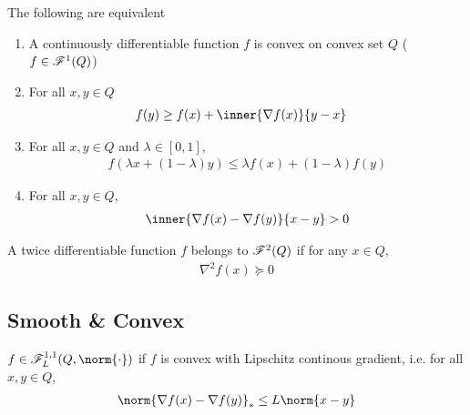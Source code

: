 \documentclass[../summary.tex]{subfiles}
\begin{document}
\begin{definition}
    The following are equivalent
    \begin{enumerate}
        \item A continuously differentiable function $f$ is convex on convex set $Q$ ($f\in\mathscr{F}^1(Q)$) 
        \item For all $x,y\in Q$
        \begin{align}
            f(y)
                &\geq f(x) + \inner{\nabla f(x)}{y-x}
                \label{eq:definition_convex}
        \end{align}
        \item For all $x,y\in Q$ and $\lambda \in[0,1]$,
        \begin{align}
            f(\lambda x + (1-\lambda)y) 
                \leq \lambda f(x) + (1-\lambda )f(y)
        \end{align}
        \item For all $x,y\in Q$, 
        \begin{align}
            \inner{\nabla f(x) - \nabla f(y)}{x - y} > 0
        \end{align}
    \end{enumerate}
\end{definition}

\begin{definition}
    A twice differentiable function $f$ belongs to $\mathscr{F}^2(Q)$ if for any $x\in Q$, 
    \begin{align}
        \nabla^2 f(x) \succeq 0
    \end{align}
\end{definition}

\subsection{Smooth \& Convex}

\begin{definition}
    $f\in \scrF^{1,1}_L(Q, \norm{\cdot})$ if $f$ is convex with Lipschitz continous gradient, i.e. for all $x,y\in Q$,
    \begin{align}
        \norm{\nabla f(x) - \nabla f(y)}_*
            \leq L\norm{x-y}
    \end{align}
\end{definition}
\end{document}
